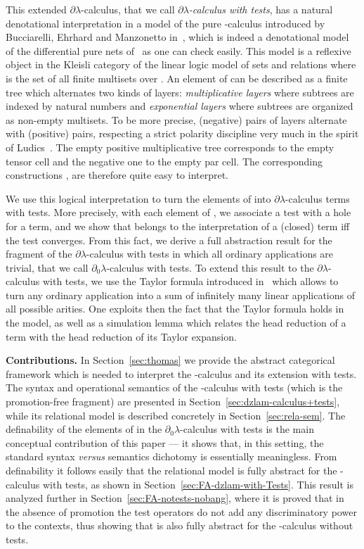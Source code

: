 \documentclass{LMCS}
\newcommand{\dlam}{\ensuremath{\partial\lambda}}
\newcommand{\dzlam}{\ensuremath{\partial_0\lambda}}
\begin{document}
This extended \dlam-calculus, that we call \emph{\dlam-calculus with tests}, has a natural denotational
interpretation in a model of the pure -calculus introduced by
Bucciarelli, Ehrhard and Manzonetto in~\cite{BucciarelliEM07},
which is indeed a denotational model of the differential pure nets
of~\cite{EhrhardL10} as one can check easily. This model is a reflexive
object    in the Kleisli category of the linear logic model of sets and relations where 
is the set of all finite multisets over . An element of  can be described as a finite
tree which alternates two kinds of layers: \emph{multiplicative layers} where
subtrees are indexed by natural numbers and \emph{exponential layers} where
subtrees are organized as non-empty multisets. To be more precise, 
(negative) pairs of layers alternate with  (positive) pairs,
respecting a strict polarity discipline very much in the spirit of
Ludics~\cite{Girard03}. The empty positive multiplicative tree corresponds to the
empty tensor cell and the negative one to the empty par cell.  The
corresponding constructions ,  are therefore quite easy to
interpret.


We use this logical interpretation to turn the elements of  into 
\dlam-calculus terms with tests. 
More precisely, with each element  of , we
associate a test  with a hole  for a term, and we show that
 belongs to the interpretation of a (closed) term  iff the test
 converges. From this fact, we derive  a full abstraction
result for the fragment of the \dlam-calculus with tests in
which all ordinary applications are trivial, that we call \dzlam-calculus with tests.
To extend this
result to the \dlam-calculus with tests, we
use the Taylor formula introduced in~\cite{EhrhardR03} which
allows to turn any ordinary application into a sum of infinitely many linear
applications of all possible arities. One exploits then the fact that the
Taylor formula holds in the model, as well as a simulation lemma
which relates the head reduction of a term with the head reduction of its
Taylor expansion.

\medskip \textbf{Contributions.}
In Section~\ref{sec:thomas} we provide the abstract categorical framework which is 
needed to interpret the -calculus and its extension with tests.
The syntax and operational semantics of the -calculus with tests (which is the promotion-free fragment)
are presented in Section~\ref{sec:dzlam-calculus+tests}, while its relational model  is described concretely in Section~\ref{sec:rela-sem}.
The definability of the elements of  in the \dzlam-calculus with tests is
the main conceptual contribution of this paper --- it shows that, in this setting, the standard syntax \emph{versus} semantics dichotomy is
essentially meaningless.  
From definability it follows easily that the relational model is fully abstract for the -calculus with tests, as shown in Section~\ref{sec:FA-dzlam-with-Tests}.
This result is analyzed further in Section~\ref{sec:FA-notests-nobang}, where it is proved that in the absence of promotion the test operators do not add any discriminatory 
power to the contexts, thus showing that  is also fully abstract for the -calculus without tests. 
\end{document}
